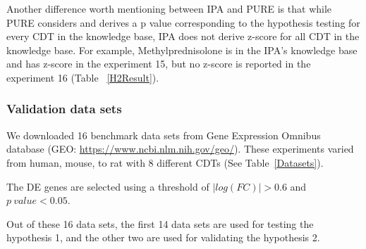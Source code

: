 Another  difference worth mentioning between IPA and PURE is that while PURE considers and derives a p value corresponding to the hypothesis testing for every CDT in the knowledge base, IPA does not derive z-score for all CDT in the knowledge base. For example, Methylprednisolone is in the IPA's knowledge base and has z-score in the experiment 15, but no z-score is reported in the experiment 16 (Table ~\ref{H2Result}).


\subsubsection{Validation data sets}

We downloaded 16 benchmark data sets from Gene Expression Omnibus database (GEO: \url{https://www.ncbi.nlm.nih.gov/geo/}). 
These experiments varied from human, mouse, to rat with 8 different CDTs (See Table~\ref{Datasets}).

The DE genes are selected using a threshold of $|log(FC)| > 0.6$ and $p\ value < 0.05$.

Out of these 16 data sets, the first 14 data sets are used for testing the hypothesis 1, and the other two are used for validating the hypothesis 2.


